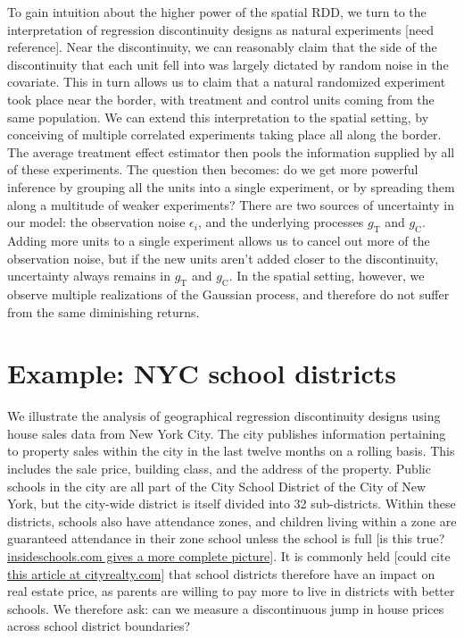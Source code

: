 \documentclass[letter]{article}
\newcommand{\treat}{\mathrm{T}}
\newcommand{\ctrol}{\mathrm{C}}
\begin{document}
To gain intuition about the higher power of the spatial RDD, we turn to the interpretation of regression discontinuity designs as natural experiments {[}need reference{]}.
Near the discontinuity, we can reasonably claim that the side of the discontinuity that each unit fell into was largely dictated by random noise in the covariate.
This in turn allows us to claim that a natural randomized experiment took place near the border, with treatment and control units coming from the same population.
We can extend this interpretation to the spatial setting, by conceiving of multiple correlated experiments taking place all along the border.
The average treatment effect estimator then pools the information supplied by all of these experiments.
The question then becomes: do we get more powerful inference by grouping all the units into a single experiment, or by spreading them along a multitude of weaker experiments?
There are two sources of uncertainty in our model: the observation noise \(\epsilon_i\), and the underlying processes \(g_\treat{}\) and \(g_\ctrol{}\). Adding more units to a single experiment allows us to cancel out more of the observation noise, but if the new units aren't added closer to the discontinuity, uncertainty always remains in \(g_\treat{}\) and \(g_\ctrol{}\). In the spatial setting, however, we observe multiple realizations of the Gaussian process, and therefore do not suffer from the same diminishing returns.
    


    	\section{Example: NYC school districts}\label{example-nyc-school-districts}

We illustrate the analysis of geographical regression discontinuity designs using house sales data from New York City.
The city publishes information pertaining to property sales within the city in the last twelve months on a rolling basis.
This includes the sale price, building class, and the address of the property.
Public schools in the city are all part of the City School District of the City of New York, but the city-wide district is itself divided into 32 sub-districts.
Within these districts, schools also have attendance zones, and children living within a zone are guaranteed attendance in their zone school unless the school is full {[}is this true? \href{http://insideschools.org/elementary/how-to-apply}{insideschools.com gives a more complete picture}{]}.
It is commonly held {[}could cite \href{https://www.cityrealty.com/nyc/market-insight/features/trending-in-ny/buying-renting-school-zone-district-what-you-need-know/3661}{this article at cityrealty.com}{]} that school districts therefore have an impact on real estate price, as parents are willing to pay more to live in districts with better schools.
We therefore ask: can we measure a discontinuous jump in house prices across school district boundaries?
    
\end{document}
